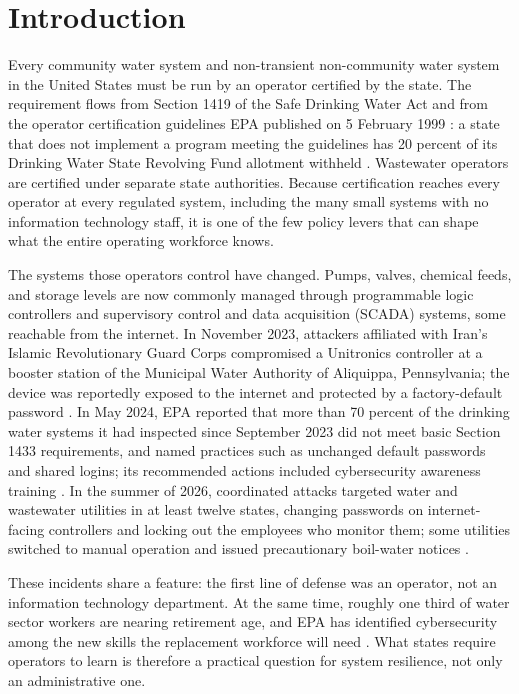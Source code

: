 \documentclass[10pt,twocolumn,letterpaper]{article}
\begin{document}
{\renewcommand{\thefootnote}{\fnsymbol{footnote}}}

\section{Introduction}

Every community water system and non-transient non-community water system in the United States must be run by an operator certified by the state. The requirement flows from Section 1419 of the Safe Drinking Water Act \cite{sdwa} and from the operator certification guidelines EPA published on 5 February 1999 \cite{epa1999}: a state that does not implement a program meeting the guidelines has 20 percent of its Drinking Water State Revolving Fund allotment withheld \cite{epaopcert}. Wastewater operators are certified under separate state authorities. Because certification reaches every operator at every regulated system, including the many small systems with no information technology staff, it is one of the few policy levers that can shape what the entire operating workforce knows.

The systems those operators control have changed. Pumps, valves, chemical feeds, and storage levels are now commonly managed through programmable logic controllers and supervisory control and data acquisition (SCADA) systems, some reachable from the internet. In November 2023, attackers affiliated with Iran's Islamic Revolutionary Guard Corps compromised a Unitronics controller at a booster station of the Municipal Water Authority of Aliquippa, Pennsylvania; the device was reportedly exposed to the internet and protected by a factory-default password \cite{securityweek}. In May 2024, EPA reported that more than 70 percent of the drinking water systems it had inspected since September 2023 did not meet basic Section 1433 requirements, and named practices such as unchanged default passwords and shared logins; its recommended actions included cybersecurity awareness training \cite{epa2024}. In the summer of 2026, coordinated attacks targeted water and wastewater utilities in at least twelve states, changing passwords on internet-facing controllers and locking out the employees who monitor them; some utilities switched to manual operation and issued precautionary boil-water notices \cite{axios2026}.

These incidents share a feature: the first line of defense was an operator, not an information technology department. At the same time, roughly one third of water sector workers are nearing retirement age, and EPA has identified cybersecurity among the new skills the replacement workforce will need \cite{epa2026}. What states require operators to learn is therefore a practical question for system resilience, not only an administrative one.
\end{document}

